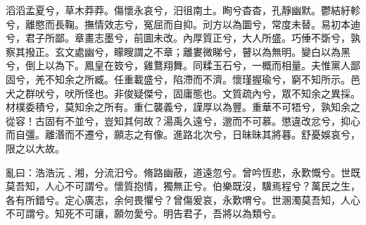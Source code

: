 
\begin{pinyinscope}
滔滔孟夏兮，草木莽莽。傷懷永哀兮，汨徂南土。眴兮杳杳，孔靜幽默。鬱結紆軫兮，離愍而長鞠。撫情效志兮，冤屈而自抑。刓方以為圜兮，常度未替。易初本迪兮，君子所鄙。章畫志墨兮，前圖未改。內厚質正兮，大人所盛。巧倕不斲兮，孰察其撥正。玄文處幽兮，矇瞍謂之不章；離婁微睇兮，瞽以為無明。變白以為黑兮，倒上以為下。鳳皇在笯兮，雞鶩翔舞。同糅玉石兮，一概而相量。夫惟黨人鄙固兮，羌不知余之所臧。任重載盛兮，陷滯而不濟。懷瑾握瑜兮，窮不知所示。邑犬之群吠兮，吠所怪也。非俊疑傑兮，固庸態也。文質疏內兮，眾不知余之異採。材樸委積兮，莫知余之所有。重仁襲義兮，謹厚以為豐。重華不可牾兮，孰知余之從容！古固有不並兮，豈知其何故？湯禹久遠兮，邈而不可慕。懲違改忿兮，抑心而自彊。離湣而不遷兮，願志之有像。進路北次兮，日昧昧其將暮。舒憂娛哀兮，限之以大故。

亂曰：浩浩沅﹑湘，分流汨兮。脩路幽蔽，道遠忽兮。曾吟恆悲，永歎慨兮。世既莫吾知，人心不可謂兮。懷質抱情，獨無正兮。伯樂既沒，驥焉程兮？萬民之生，各有所錯兮。定心廣志，余何畏懼兮？曾傷爰哀，永歎喟兮。世溷濁莫吾知，人心不可謂兮。知死不可讓，願勿愛兮。明告君子，吾將以為類兮。


\end{pinyinscope}
